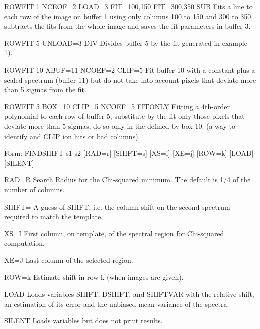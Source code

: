 {\newpage\clearpage
{}%
\begin{example}
  \item[ROWFIT 1 NCEOF=2 LOAD=3 FIT=100,150 FIT=300,350 SUB \hfill]{ Fits a
       line to each row of the image on buffer 1 using only columns 100 to
       150 and 300 to 350, subtracts the fits from the whole image and
       saves the fit parameters in buffer 3.}
\par\item[ROWFIT 5 UNLOAD=3 DIV\hfill]{ Divides buffer 5 by the fit generated
       in example 1).}
\par\item[ROWFIT 10 XBUF=11 NCOEF=2 CLIP=5\hfill]{ Fit buffer 10 with a
       constant plus a scaled spectrum (buffer 11) but do not take into
       account pixels that deviate more than 5 sigmas from the fit.}
\par\item[ROWFIT 5 BOX=10 CLIP=5 NCOEF=5 FITONLY\hfill]{ Fitting a 4th-order
       polynomial to each row of buffer 5, substitute by the fit only those
       pixels that deviate more than 5 sigmas, do so only in the defined by
       box 10. (a way to identify and CLIP ion hits or bad columns).}
\end{example}%
\lthtmlfigureZ
\lthtmlcheckvsize\clearpage}

{\newpage\clearpage
{}%
\begin{command}
  \item[Form: FINDSHIFT s1 s2 {[RAD=r]} {[SHIFT=s]} {[XS=i]} {[XE=j]} 
       {[ROW=k]} {[LOAD]} {[SILENT]}\hfill]{}
  \item[RAD=R]{Search Radius for the Chi-squared minimum.
               The default is 1/4 of the number of columns.}
  \item[SHIFT=]{A guess of SHIFT, i.e. the column shift on the
                second spectrum required to match the template.}
  \item[XS=I]{First column, on template, of the spectral
              region for Chi-squared computation.}
  \item[XE=J]{Last column of the selected region.}
  \item[ROW=k]{Estimate shift in row k (when images are given).}
  \item[LOAD]{Loads variables SHIFT, DSHIFT, and SHIFTVAR with
              the relative shift, an estimation of its error
              and the unbiased mean variance of the spectra.}
  \item[SILENT]{Loads variables but does not print results.}
\end{command}%
\lthtmlfigureZ
\lthtmlcheckvsize\clearpage}

